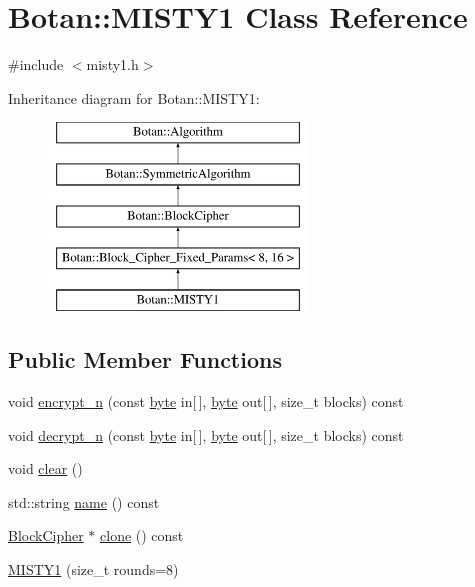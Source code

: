 \hypertarget{classBotan_1_1MISTY1}{\section{Botan\-:\-:M\-I\-S\-T\-Y1 Class Reference}
\label{classBotan_1_1MISTY1}
}


{\ttfamily \#include $<$misty1.\-h$>$}

Inheritance diagram for Botan\-:\-:M\-I\-S\-T\-Y1\-:\begin{figure}[H]
\begin{center}
\leavevmode
\includegraphics[height=5.000000cm]{classBotan_1_1MISTY1}
\end{center}
\end{figure}
\subsection*{Public Member Functions}
\begin{DoxyCompactItemize}
\item 
void \hyperlink{classBotan_1_1MISTY1_a791b5a1aba41929f31a0f0531608c570}{encrypt\-\_\-n} (const \hyperlink{namespaceBotan_a7d793989d801281df48c6b19616b8b84}{byte} in\mbox{[}$\,$\mbox{]}, \hyperlink{namespaceBotan_a7d793989d801281df48c6b19616b8b84}{byte} out\mbox{[}$\,$\mbox{]}, size\-\_\-t blocks) const 
\item 
void \hyperlink{classBotan_1_1MISTY1_afaf2618e9875c7d7cb2fb5c37db17461}{decrypt\-\_\-n} (const \hyperlink{namespaceBotan_a7d793989d801281df48c6b19616b8b84}{byte} in\mbox{[}$\,$\mbox{]}, \hyperlink{namespaceBotan_a7d793989d801281df48c6b19616b8b84}{byte} out\mbox{[}$\,$\mbox{]}, size\-\_\-t blocks) const 
\item 
void \hyperlink{classBotan_1_1MISTY1_a9ae9f36b54129eefec39d17e00d8cb95}{clear} ()
\item 
std\-::string \hyperlink{classBotan_1_1MISTY1_a544b94388d8ab1f93987319557a51df0}{name} () const 
\item 
\hyperlink{classBotan_1_1BlockCipher}{Block\-Cipher} $\ast$ \hyperlink{classBotan_1_1MISTY1_a923683415b990050a1370c9907d0cad6}{clone} () const 
\item 
\hyperlink{classBotan_1_1MISTY1_ac3dd68725867434dbb6b09eedba1b119}{M\-I\-S\-T\-Y1} (size\-\_\-t rounds=8)
\end{DoxyCompactItemize}
